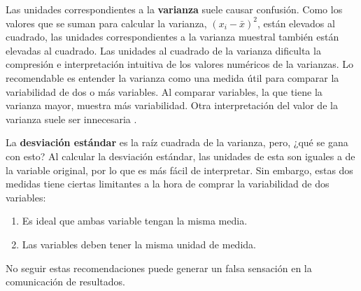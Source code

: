 \documentclass[
]{book}
\providecommand{\tightlist}{%
  \setlength{\itemsep}{0pt}\setlength{\parskip}{0pt}}
\theoremstyle{definition}
\theoremstyle{definition}
\theoremstyle{definition}
\theoremstyle{definition}
\theoremstyle{remark}
\begin{document}
Las unidades correspondientes a la \textbf{varianza} suele causar confusión. Como los valores que se suman para calcular la varianza, \((x_i-\bar{x})^2\), están elevados al cuadrado, las unidades correspondientes a la varianza muestral también están elevadas al cuadrado. Las unidades al cuadrado de la varianza dificulta la compresión e interpretación intuitiva de los valores numéricos de la varianzas. Lo recomendable es entender la varianza como una medida útil para comparar la variabilidad de dos o más variables. Al comparar variables, la que tiene la varianza mayor, muestra más variabilidad. Otra interpretación del valor de la varianza suele ser innecesaria \citep[página 94]{anderson}.

La \textbf{desviación estándar} es la raíz cuadrada de la varianza, pero, ¿qué se gana con esto? Al calcular la desviación estándar, las unidades de esta son iguales a de la variable original, por lo que es más fácil de interpretar. Sin embargo, estas dos medidas tiene ciertas limitantes a la hora de comprar la variabilidad de dos variables:

\begin{enumerate}
\def\labelenumi{\arabic{enumi}.}
\tightlist
\item
  Es ideal que ambas variable tengan la misma media.
\item
  Las variables deben tener la misma unidad de medida.
\end{enumerate}

No seguir estas recomendaciones puede generar un falsa sensación en la comunicación de resultados.
\end{document}
